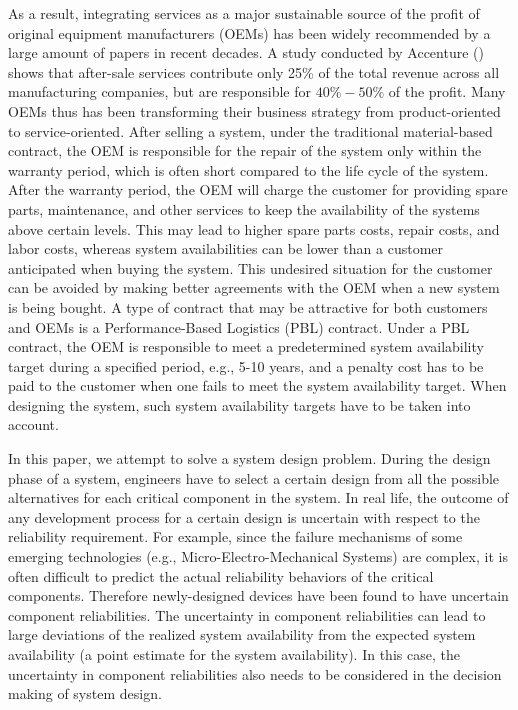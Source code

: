 \documentclass[preprint,12pt]{elsarticle}
\begin{document}
As a result, integrating services as a major sustainable source of the profit of original equipment manufacturers (OEMs) has been widely recommended by a large amount of papers in recent decades. A study conducted by Accenture (\citet{Dennis}) shows that after-sale services contribute only 25\% of the total revenue across all manufacturing companies, but are responsible for $40\%-50\%$ of the profit. Many OEMs thus has been transforming their business strategy from product-oriented to service-oriented. After selling a system, under the traditional material-based contract, the OEM is responsible for the repair of the system only within the warranty period, which is often short compared to the life cycle of the system. After the warranty period, the OEM will charge the customer for providing spare parts, maintenance, and other services to keep the availability of the systems above certain levels. This may lead to higher spare parts costs, repair costs, and labor costs, whereas system availabilities can be lower than a customer anticipated when buying the system. This undesired situation for the customer can be avoided by making better agreements with the OEM when a new system is being bought. A type of contract that may be attractive for both customers and OEMs is a Performance-Based Logistics (PBL) contract. Under a PBL contract, the OEM is responsible to meet a predetermined system availability target during a specified period, e.g., 5-10 years, and a penalty cost has to be paid to the customer when one fails to meet the system availability target. When designing the system, such system availability targets have to be taken into account.


In this paper, we attempt to solve a system design problem. During the design phase of a system, engineers have to select a certain design from all the possible alternatives for each critical component in the system. In real life, the outcome of any development process for a certain design is uncertain with respect to the reliability requirement. For example, since the failure mechanisms of some emerging technologies (e.g., Micro-Electro-Mechanical Systems) are complex, it is often difficult to predict the actual reliability behaviors of the critical components. Therefore newly-designed devices have been found to have uncertain component reliabilities. The uncertainty in component reliabilities can lead to large deviations of the realized system availability from the expected system availability (a point estimate for the system availability). In this case, the uncertainty in component reliabilities also needs to be considered in the decision making of system design.
\end{document}
